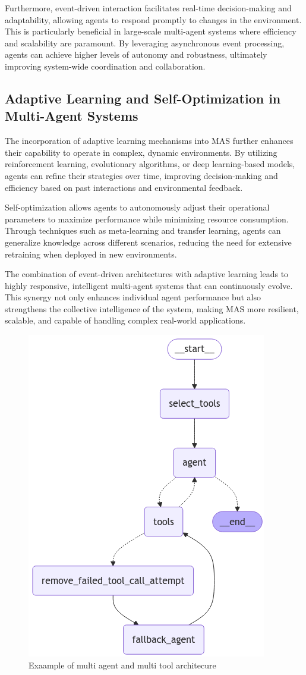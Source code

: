 Furthermore, event-driven interaction facilitates real-time decision-making and adaptability, allowing agents to respond promptly to changes in the environment. This is particularly beneficial in large-scale multi-agent systems where efficiency and scalability are paramount. By leveraging asynchronous event processing, agents can achieve higher levels of autonomy and robustness, ultimately improving system-wide coordination and collaboration.

\subsection{Adaptive Learning and Self-Optimization in Multi-Agent Systems}

The incorporation of adaptive learning mechanisms into MAS further enhances their capability to operate in complex, dynamic environments. By utilizing reinforcement learning, evolutionary algorithms, or deep learning-based models, agents can refine their strategies over time, improving decision-making and efficiency based on past interactions and environmental feedback.

Self-optimization allows agents to autonomously adjust their operational parameters to maximize performance while minimizing resource consumption. Through techniques such as meta-learning and transfer learning, agents can generalize knowledge across different scenarios, reducing the need for extensive retraining when deployed in new environments.

The combination of event-driven architectures with adaptive learning leads to highly responsive, intelligent multi-agent systems that can continuously evolve. This synergy not only enhances individual agent performance but also strengthens the collective intelligence of the system, making MAS more resilient, scalable, and capable of handling complex real-world applications.

\begin{figure}[h!]
    \centering
    \includegraphics[width=0.5\linewidth]{Assets/complex_agent.png}
    \caption{Exaample of multi agent and multi tool architecure}
    \label{fig:enter-label}
\end{figure}
